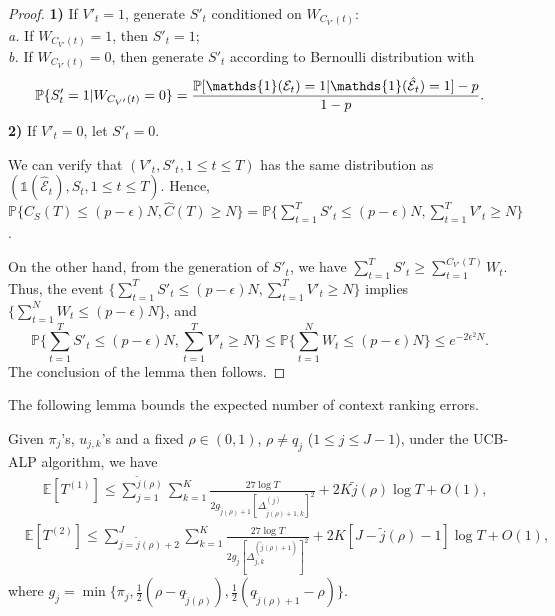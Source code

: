 \begin{proof}
\textbf{1)} If $V'_t = 1$, generate $S'_t$ conditioned on $W_{C_{V'}(t)}$: \\
{\it \hspace{0.1in}a.} If $W_{C_{V'}(t)} = 1$, then $S'_t = 1$;\\
{\it \hspace{0.1in}b.} If $W_{C_{V'}(t)} = 0$, then generate $S'_t$ according to Bernoulli distribution with
\begin{equation}
\mathbb{P}\{S'_t = 1 | W_{C_{V'}(t)} = 0\} = \frac{\mathbb{P}[\mathds{1}({\mathcal{E}}_t) = 1| \mathds{1}(\hat{\mathcal{E}}_t) = 1]-p}{1-p}. \nonumber\\
\end{equation}
\textbf{2)} If $V'_t = 0$, let $S'_t = 0$.

We can verify that $(V'_t, S'_t, 1\leq t \leq T)$ has the  same distribution as $(\mathds{1}(\hat{\mathcal{E}}_t), S_t, 1\leq t \leq T)$. Hence, $\mathbb{P}\{C_S(T) \leq (p-\epsilon) N, \widehat{C}(T) \geq N \} = \mathbb{P}\{\sum_{t=1}^T S'_t \leq (p-\epsilon)N, \sum_{t=1}^T V'_t \geq N\}$.

On the other hand, from the generation of $S'_t$,  we have $\sum_{t=1}^T S'_t \geq \sum_{t=1}^{C_{V'}(T)} W_t$.
Thus, the event $\{\sum_{t=1}^T S'_t \leq (p-\epsilon)N, \sum_{t=1}^T V'_t \geq N\}$ implies $\{\sum_{t=1}^N W_t \leq (p-\epsilon) N\}$, and
\begin{equation}
\mathbb{P}\{\sum_{t=1}^T S'_t \leq (p-\epsilon)N, \sum_{t=1}^T V'_t \geq N\}\leq \mathbb{P}\{\sum_{t=1}^N W_t \leq (p-\epsilon) N\} \leq e^{-2 \epsilon^2 N}.
\end{equation}
The conclusion of the lemma then follows.
\end{proof}

The following lemma bounds the expected number of context ranking errors.
\begin{lemma}\label{thm:error_ranking}
Given $\pi_j$'s, $u_{j,k}$'s and a fixed $\rho \in (0,1)$, $\rho  \neq q_j$ ($1 \leq j \leq J-1$), under the UCB-ALP algorithm, we have
\begin{align}
&\mathbb{E}[T^{(1)}] \leq \sum_{j = 1}^{\tilde{j}(\rho)}\sum_{k=1}^K\frac{27\log T}{2g_{\tilde{j}(\rho)+1} [\Delta^{(j)}_{\tilde{j}(\rho)+1,k}]^2} + 2K\tilde{j}(\rho) \log T + O(1),\nonumber
\end{align}
\begin{align}
&\mathbb{E}[T^{(2)}] \leq \sum_{j =\tilde{j}(\rho)+2}^{J}\sum_{k=1}^K\frac{27\log T}{2g_j [\Delta^{(\tilde{j}(\rho)+1)}_{j,k}]^2} + 2K[J - \tilde{j}(\rho)-1]\log T + O(1), \nonumber
\end{align}
where
$
g_j  =\min\big\{\pi_j, \frac{1}{2}(\rho - q_{\tilde{j}(\rho)}), \frac{1}{2}(q_{\tilde{j}(\rho)+1} -\rho)\big\}.
$
\end{lemma}

